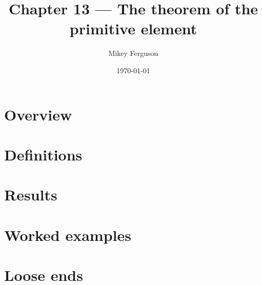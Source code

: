 \documentclass[11pt]{article}
\title{Chapter 13 --- The theorem of the primitive element}
\author{Mikey Ferguson}
\date{\today}
\begin{document}
\maketitle
\tableofcontents
\bigskip

\section{Overview}

\section{Definitions}

\section{Results}

\section{Worked examples}

\section{Loose ends}
\end{document}
